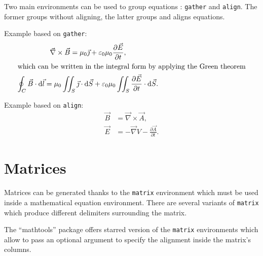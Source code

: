 \documentclass[11pt, a4paper, english]{report}
\begin{document}
		Two main environments can be used to group equations : \texttt{gather} and \texttt{align}.
		The former groups without aligning, the latter groups and aligns equations.
		
		Example based on \texttt{gather}:
		\begin{gather}
			\vec{\nabla} \times \vec{B}
				= \mu_0 \vec{\jmath}
				+ \varepsilon_0 \mu_0 \frac{\partial \vec{E}}{\partial t}, \\
			\intertext{which can be written in the integral form by applying the Green theorem}
			\oint_{C} \vec{B} \cdot \mathrm{d} \vec{l}
				= \mu_0 \iint_S \vec{\jmath} \cdot \mathrm{d} \vec{S}
				+ \varepsilon_0 \mu_0 \iint_S \frac{\partial \vec{E}}{\partial t} \cdot \mathrm{d} \vec{S}.
		\end{gather}
		
		Example based on \texttt{align}:
		\begin{align}
			\vec{B} &= \vec{\nabla} \times \vec{A}, \\
			\vec{E} &= -\vec{\nabla} V - \frac{\partial \vec{A}}{\partial t}.
		\end{align}
	
	
	\section{Matrices}
	
		Matrices can be generated thanks to the \texttt{matrix} environment which must be used inside a mathematical equation environment.
		There are several variants of \texttt{matrix} which produce different delimiters surrounding the matrix.
		
		The \enquote{mathtools} package offers starred version of the \texttt{matrix} environments which allow to pass an optional argument to specify the alignment inside the matrix's columns.
		
\end{document}
